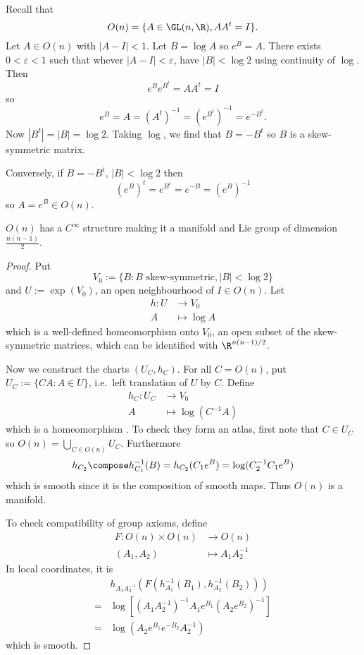 \documentclass[a4paper]{article}
\begin{document}
\begin{eg}
  Recall that
  \[
    O(n) = \{A \in \GL(n, \R), AA^t = I\}.
  \]
  Let \(A \in O(n)\) with \(|A - I| < 1\). Let \(B = \log A\) so \(e^B = A\). There exists \(0 < \varepsilon < 1\) such that whever \(|A - I| < \varepsilon\), have \(|B| < \log 2\) using continuity of \(\log\). Then
  \[
    e^B e^{B^t} = AA^t = I
  \]
  so
  \[
    e^B = A = (A^t)^{-1} = (e^{B^t})^{-1} = e^{-B^t}.
  \]
  Now \(|B^t| = |B| = \log 2\). Taking \(\log\), we find that \(B = -B^t\) so \(B\) is a skew-symmetric matrix.

  Conversely, if \(B = - B^t\), \(|B| < \log 2\) then
  \[
    (e^B)^t = e^{B^t} = e^{-B} = (e^B)^{-1}
  \]
  so \(A = e^B \in O(n)\).

\begin{proposition}
  \(O(n)\) has a \(C^\infty\) structure making it a manifold and Lie group of dimension \(\frac{n(n - 1)}{2}\).
\end{proposition}

\begin{proof}
  Put
  \[
    V_0 := \{B: B \text{ skew-symmetric}, |B| < \log 2\}
  \]
  and \(U := \exp (V_0)\), an open neighbourhood of \(I \in O(n)\). Let
  \begin{align*}
    h: U &\to V_0 \\
    A &\mapsto \log A
  \end{align*}
  which is a well-defined homeomorphism onto \(V_0\), an open subset of the skew-symmetric matrices, which can be identified with \(\R^{n(n - 1)/2}\).

  Now we construct the charts \((U_C, h_C)\). For all \(C = O(n)\), put \(U_C := \{CA: A \in U\}\), i.e.\ left translation of \(U\) by \(C\). Define
  \begin{align*}
    h_C: U_C &\to V_0 \\
    A &\mapsto \log (C^{-1}A)
  \end{align*}
  which is a homeomorphism %
  . To check they form an atlas, first note that \(C \in U_C\) so \(O(n) = \bigcup_{C \in O(n)} U_C\). Furthermore
  \[
    h_{C_2} \compose h_{C_1}^{-1} (B) = h_{C_2} (C_1 e^B) = \log (C_2^{-1}C_1 e^B)
  \]
  which is smooth since it is the composition of smooth maps. Thus \(O(n)\) is a manifold.

  To check compatibility of group axioms, define
  \begin{align*}
    F: O(n) \times O(n) &\to O(n) \\
    (A_1, A_2) &\mapsto A_1A_2^{-1}
  \end{align*}
  In local coordinates, it is
  \begin{align*}
    &h_{A_1A_2^{-1}} (F(h_{A_1}^{-1}(B_1), h_{A_2}^{-1}(B_2))) \\
    =& \log [(A_1A_2^{-1})^{-1}A_1 e^{B_1} (A_2 e^{B_2})^{-1}] \\
    =& \log (A_2 e^{B_1} e^{-B_2} A_2^{-1})
  \end{align*}
  which is smooth.
\end{proof}
\end{eg}
\end{document}
